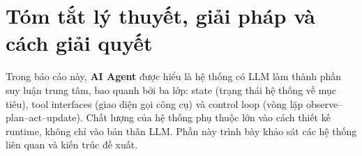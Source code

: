 
\section{Tóm tắt lý thuyết, giải pháp và cách giải quyết}
\label{sec:tom-tat-ly-thuyet}

Trong báo cáo này, \textbf{AI Agent} được hiểu là hệ thống có LLM làm thành phần suy luận trung tâm, bao quanh bởi ba lớp: state (trạng thái hệ thống về mục tiêu), tool interfaces (giao diện gọi công cụ) và control loop (vòng lặp observe--plan--act--update). Chất lượng của hệ thống phụ thuộc lớn vào cách thiết kế runtime, không chỉ vào bản thân LLM. Phần này trình bày khảo sát các hệ thống liên quan và kiến trúc đề xuất.






